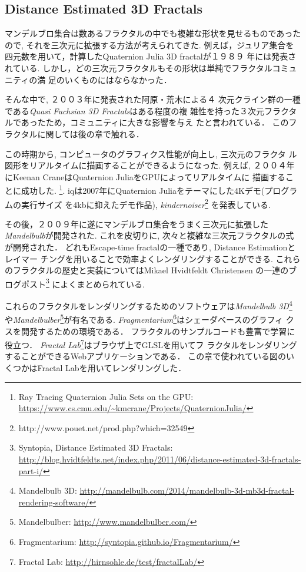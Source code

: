 \subsection{Distance Estimated 3D Fractals}

マンデルブロ集合は数あるフラクタルの中でも複雑な形状を見せるものであった
ので, それを三次元に拡張する方法が考えられてきた.
例えば，ジュリア集合を四元数を用いて，計算したQuaternion Julia 3D
fractal\cite{4djulia}が１９８９
年には発表されている.
しかし，どの三次元フラクタルもその形状は単純でフラクタルコミュニティの満
足のいくものにはならなかった．

そんな中で, ２００３年に発表された阿原・荒木\cite{sphairahedra}による４
次元クライン群の一種である{\it Quasi Fuchsian 3D Fractals}はある程度の複
雑性を持った３次元フラクタルであったため，コミュニティに大きな影響を与え
たと言われている．
このフラクタルに関しては後の章で触れる．

この時期から, コンピュータのグラフィクス性能が向上し, 三次元のフラクタ
ル図形をリアルタイムに描画することができるようになった.
例えば, ２００４年にKeenan CraneはQuaternion JuliaをGPUによってリアルタイムに
描画することに成功した. \footnote{Ray Tracing Quaternion Julia Sets on
the GPU:
\url{https://www.cs.cmu.edu/~kmcrane/Projects/QuaternionJulia/}}.
iqは2007年にQuaternion Juliaをテーマにした4Kデモ(プログラムの実行サイズ
を4kbに抑えたデモ作品),
\textit{kindernoiser}\footnote{http://www.pouet.net/prod.php?which=32549}
を発表している.

その後，２００９年に遂にマンデルブロ集合をうまく三次元に拡張した{\it
Mandelbulb}が開発された.
これを皮切りに, 次々と複雑な三次元フラクタルの式が開発された．
どれもEscape-time fractalの一種であり, Distance Estimationとレイマー
チングを用いることで効率よくレンダリングすることができる.
これらのフラクタルの歴史と実装についてはMikael Hvidtfeldt Christensen
の一連のブログポスト\footnote{Syntopia, Distance Estimated 3D
Fractals:\\ \quad \quad
\url{http://blog.hvidtfeldts.net/index.php/2011/06/distance-estimated-3d-fractals-part-i/}}
によくまとめられている.

これらのフラクタルをレンダリングするためのソフトウェアは{\it Mandelbulb
3D}\footnote{Mandelbulb 3D:
\url{http://mandelbulb.com/2014/mandelbulb-3d-mb3d-fractal-rendering-software/}}
や{\it Mandelbulber}\footnote{Mandelbulber:
\url{http://www.mandelbulber.com/}}が有名である.
{\it Fragmentarium}\footnote{Fragmentarium:
\url{http://syntopia.github.io/Fragmentarium/}}はシェーダベースのグラフィ
クスを開発するための環境である．
フラクタルのサンプルコードも豊富で学習に役立つ．
{\it Fractal Lab}\footnote{Fractal Lab:
\url{http://hirnsohle.de/test/fractalLab/}}はブラウザ上でGLSLを用いてフ
ラクタルをレンダリングすることができるWebアプリケーションである．
この章で使われている図のいくつかはFractal Labを用いてレンダリングした．

